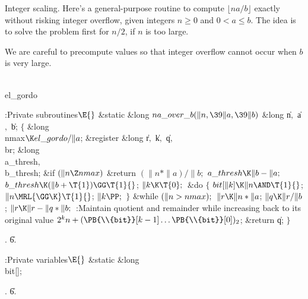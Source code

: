 Integer scaling.
Here's a general-purpose routine to compute $\lfloor na/b\rfloor$ exactly
without risking integer overflow, given integers $n\ge0$ and $0<a\le b$.
The idea is to solve the problem first for $n/2$, if $n$ is too large.

We are careful to precompute values so that integer overflow cannot
occur when $b$ is very large.

\Y\B\4\D\\{el\_gordo}\5
\par
\Y\B\4:Private subroutines\X${}\E{}$\6
\1\1\&{static} \&{long} ${}\\{na\_over\_b}(\|n,\39\|a,\39\|b){}$\6
\&{long} \|n${},{}$ \|a${},{}$ \|b;\2\2\6
${}\{{}$\5
\1\&{long} \\{nmax}${}\K\\{el\_gordo}/\|a{}$;\6
\&{register} \&{long} \|r${},{}$ \|k${},{}$ \|q${},{}$ \\{br};\6
\&{long} \\{a\_thresh}${},{}$ \\{b\_thresh};\7
\&{if} ${}(\|n\Z\\{nmax}){}$\1\5
\&{return} ${}(\|n*\|a)/\|b;{}$\2\6
${}\\{a\_thresh}\K\|b-\|a;{}$\6
${}\\{b\_thresh}\K(\|b+\T{1})\GG\T{1}{}$;\6
${}\|k\K\T{0};{}$\6
\&{do}\5
${}\{{}$\5
\1${}\\{bit}[\|k]\K\|n\AND\T{1}{}$;\6
${}\|n\MRL{{\GG}{\K}}\T{1}{}$;\6
${}\|k\PP;{}$\6
\4${}\}{}$\5
\2\5
\&{while} ${}(\|n>\\{nmax});{}$\6
${}\|r\K\|n*\|a{}$;\5
${}\|q\K\|r/\|b{}$;\5
${}\|r\K\|r-\|q*\|b;{}$\6
:Maintain quotient  and remainder  while increasing  back to its original value $2^kn+(\PB{\\{bit}}[k-1]\ldots \PB{%
\\{bit}}[0])_2$\X;\6
\&{return} \|q;\6
\4${}\}{}$\2\par
{}.
\U6.\fi

\B{}:Private variables\X${}\E{}$\6
\&{static} \&{long} \\{bit}[];\par
{}.
\U6.\fi

